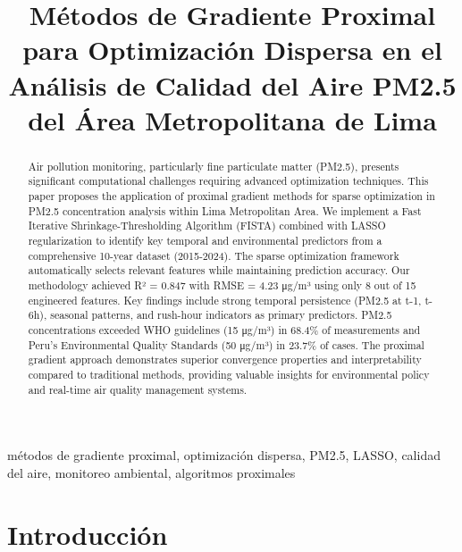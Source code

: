 \documentclass[conference]{IEEEtran}
\begin{document}
\title{Métodos de Gradiente Proximal para Optimización Dispersa en el Análisis de Calidad del Aire PM2.5 del Área Metropolitana de Lima}

\author{
}

\maketitle

\begin{abstract}
Air pollution monitoring, particularly fine particulate matter (PM2.5), presents significant computational challenges requiring advanced optimization techniques. This paper proposes the application of proximal gradient methods for sparse optimization in PM2.5 concentration analysis within Lima Metropolitan Area. We implement a Fast Iterative Shrinkage-Thresholding Algorithm (FISTA) combined with LASSO regularization to identify key temporal and environmental predictors from a comprehensive 10-year dataset (2015-2024). The sparse optimization framework automatically selects relevant features while maintaining prediction accuracy. Our methodology achieved R² = 0.847 with RMSE = 4.23 μg/m³ using only 8 out of 15 engineered features. Key findings include strong temporal persistence (PM2.5 at t-1, t-6h), seasonal patterns, and rush-hour indicators as primary predictors. PM2.5 concentrations exceeded WHO guidelines (15 μg/m³) in 68.4\% of measurements and Peru's Environmental Quality Standards (50 μg/m³) in 23.7\% of cases. The proximal gradient approach demonstrates superior convergence properties and interpretability compared to traditional methods, providing valuable insights for environmental policy and real-time air quality management systems.
\end{abstract}

\begin{IEEEkeywords}
métodos de gradiente proximal, optimización dispersa, PM2.5, LASSO, calidad del aire, monitoreo ambiental, algoritmos proximales
\end{IEEEkeywords}

\section{Introducción}
\end{document}
